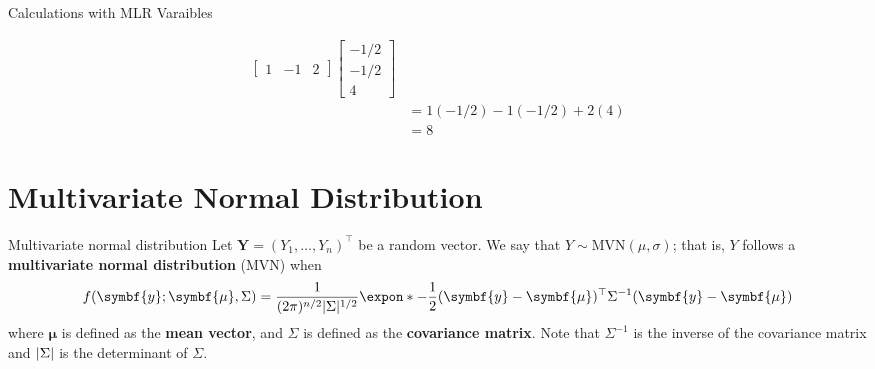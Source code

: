 \begin{Example}{Calculations with MLR Varaibles}{}
\begin{enumerate}[label=(\roman*)]
\begin{align*}
\begin{bmatrix}
                      1 & -1 & 2
                  \end{bmatrix}
                  \begin{bmatrix}
                      -1/2 \\
                      -1/2 \\
                      4
                  \end{bmatrix}                  \\
                   & =1(-1/2)-1(-1/2)+2(4)                    \\
                   & =8
              \end{align*}
    \end{enumerate}
\end{Example}
\section{Multivariate Normal Distribution}
\begin{Definition}{Multivariate normal distribution}{}
    Let $ \symbf{Y}=(Y_1,\ldots,Y_n)^\top $
    be a random vector. We say
    that $ Y \sim \text{MVN}(\mu,\sigma) $; that is,
    $ Y $ follows a \textbf{multivariate normal distribution} (MVN) when
    \[ f(\symbf{y};\symbf{\mu},\Sigma)=
        \frac{1}{(2\pi)^{n/2}\abs{\Sigma}^{1/2}}
        \expon*{-\frac{1}{2}(\symbf{y}-\symbf{\mu})^\top
            \Sigma^{-1}(\symbf{y}-\symbf{\mu})}  \]
    where $ \symbf{\mu} $ is defined as the \textbf{mean vector},
    and $ \Sigma $ is defined as the \textbf{covariance matrix}.
    Note that $ \Sigma^{-1} $ is the inverse of the covariance matrix
    and $ \lvert\Sigma\rvert $ is the determinant of $ \Sigma $.
\end{Definition}

